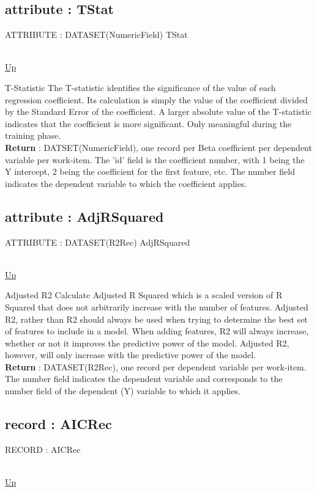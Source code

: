 \subsection*{attribute : TStat}
\hypertarget{ecldoc:linearregression.ols.tstat}{ATTRIBUTE : DATASET(NumericField) TStat} \\
\hyperlink{ecldoc:linearregression.ols}{Up} \\
\par
T-Statistic The T-statistic identifies the significance of the value of each regression coefficient. Its calculation is simply the value of the coefficient divided by the Standard Error of the coefficient. A larger absolute value of the T-statistic indicates that the coefficient is more significant. Only meaningful during the training phase. \\
\textbf{Return} : DATSET(NumericField), one record per Beta coefficient per dependent variable per work-item. The 'id' field is the coefficient number, with 1 being the Y intercept, 2 being the coefficient for the first feature, etc. The number field indicates the dependent variable to which the coefficient applies. \\
\subsection*{attribute : AdjRSquared}
\hypertarget{ecldoc:linearregression.ols.adjrsquared}{ATTRIBUTE : DATASET(R2Rec) AdjRSquared} \\
\hyperlink{ecldoc:linearregression.ols}{Up} \\
\par
Adjusted R2 Calculate Adjusted R Squared which is a scaled version of R Squared that does not arbitrarily increase with the number of features. Adjusted R2, rather than R2 should always be used when trying to determine the best set of features to include in a model. When adding features, R2 will always increase, whether or not it improves the predictive power of the model. Adjusted R2, however, will only increase with the predictive power of the model. \\
\textbf{Return} : DATASET(R2Rec), one record per dependent variable per work-item. The number field indicates the dependent variable and corresponds to the number field of the dependent (Y) variable to which it applies. \\
\subsection*{record : AICRec}
\hypertarget{ecldoc:linearregression.ols.aicrec}{RECORD : AICRec} \\
\hyperlink{ecldoc:linearregression.ols}{Up} \\
\par
